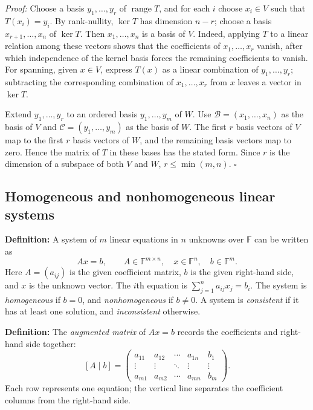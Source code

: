 \documentclass[a4paper,11pt,abstract=true]{scrartcl}
\theoremstyle{dotlessP}
\theoremstyle{dotlessS}
\theoremstyle{remark}
\theoremstyle{definition}
\begin{document}
\begin{claim_box}
\textit{Proof:} Choose a basis $y_1,\ldots,y_r$ of
$\operatorname{range}T$, and for each $i$ choose $x_i\in V$ such that
$T(x_i)=y_i$. By rank-nullity, $\ker T$ has dimension $n-r$; choose a
basis $x_{r+1},\ldots,x_n$ of $\ker T$. Then
$x_1,\ldots,x_n$ is a basis of $V$. Indeed, applying $T$ to a linear
relation among these vectors shows that the coefficients of
$x_1,\ldots,x_r$ vanish, after which independence of the kernel basis
forces the remaining coefficients to vanish. For spanning, given
$x\in V$, express $T(x)$ as a linear combination of
$y_1,\ldots,y_r$; subtracting the corresponding combination of
$x_1,\ldots,x_r$ from $x$ leaves a vector in $\ker T$.

Extend $y_1,\ldots,y_r$ to an ordered basis
$y_1,\ldots,y_m$ of $W$. Use
$\mathcal{B}=(x_1,\ldots,x_n)$ as the basis of $V$ and
$\mathcal{C}=(y_1,\ldots,y_m)$ as the basis of $W$. The first $r$
basis vectors of $V$ map to the first $r$ basis vectors of $W$, and
the remaining basis vectors map to zero. Hence the matrix of $T$ in
these bases has the stated form. Since $r$ is the dimension of a
subspace of both $V$ and $W$, $r\leq\min(m,n)$. \hfill$\square$
\end{claim_box}

\subsection{Homogeneous and nonhomogeneous linear systems}

\begin{definition_box}
\textbf{Definition:} A system of $m$ linear equations in $n$
unknowns over $\mathbb{F}$ can be written as
\[
Ax=b,
\qquad A\in\mathbb{F}^{m\times n},\quad
x\in\mathbb{F}^n,\quad b\in\mathbb{F}^m.
\]
Here $A=(a_{ij})$ is the given coefficient matrix, $b$ is the given
right-hand side, and $x$ is the unknown vector. The $i$th equation is
$\sum_{j=1}^n a_{ij}x_j=b_i$. The system is \emph{homogeneous} if
$b=0$, and \emph{nonhomogeneous} if $b\neq0$. A system is
\emph{consistent} if it has at least one solution, and
\emph{inconsistent} otherwise.
\end{definition_box}

\begin{claim_box}
\textbf{Definition:} The \emph{augmented matrix}
of $Ax=b$ records the coefficients and right-hand side together:
\[
[A\mid b]=\left(\begin{array}{cccc|c}
a_{11}&a_{12}&\cdots&a_{1n}&b_1\\
\vdots&\vdots&\ddots&\vdots&\vdots\\
a_{m1}&a_{m2}&\cdots&a_{mn}&b_m
\end{array}\right).
\]
Each row represents one equation; the vertical line separates the
coefficient columns from the right-hand side.
\end{claim_box}
\end{document}
